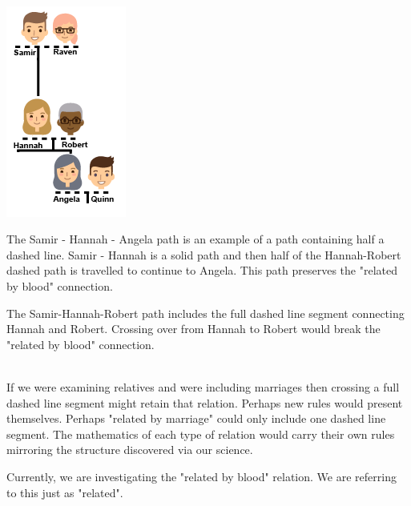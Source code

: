 \documentclass{ximera}
\begin{document}
\begin{notation}
\quad \\

\begin{center}
\includegraphics{pics/Samir_Hannah_Angela.png}
\end{center}

The Samir - Hannah - Angela path is an example of a path containing half a dashed line. Samir - Hannah is a solid path and then half of the Hannah-Robert dashed path is travelled to continue to Angela.  This path preserves the "related by blood" connection.

The Samir-Hannah-Robert path includes the full dashed line segment connecting Hannah and Robert.  Crossing over from Hannah to Robert would break the "related by blood" connection.

\end{notation}

\quad \\






If we were examining relatives and were including marriages then crossing a full dashed line segment might retain that relation. Perhaps new rules would present themselves. Perhaps "related by marriage" could only include one dashed line segment.  The mathematics of each type of relation would carry their own rules mirroring the structure discovered via our science.

Currently, we are investigating the "related by blood" relation. We are referring to this just as "related".
\end{document}
